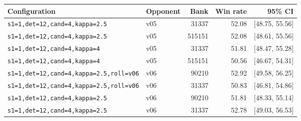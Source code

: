 \begin{tabular}{llrrr}
\toprule
Configuration & Opponent & Bank & Win rate & 95\% CI \\
\midrule
\texttt{s1=1,det=12,cand=4,kappa=2.5} & v05 & 31337 & 52.08 & [48.75, 55.56] \\
\texttt{s1=1,det=12,cand=4,kappa=2.5} & v05 & 515151 & 52.08 & [48.61, 55.56] \\
\texttt{s1=1,det=12,cand=4,kappa=4} & v05 & 31337 & 51.81 & [48.47, 55.28] \\
\texttt{s1=1,det=12,cand=4,kappa=4} & v05 & 515151 & 50.56 & [46.67, 54.31] \\
\texttt{s1=1,det=12,cand=4,kappa=2.5,roll=v06} & v06 & 90210 & 52.92 & [49.58, 56.25] \\
\texttt{s1=1,det=12,cand=4,kappa=2.5,roll=v06} & v06 & 31337 & 50.83 & [46.81, 54.86] \\
\texttt{s1=1,det=12,cand=4,kappa=2.5} & v06 & 90210 & 51.81 & [48.33, 55.14] \\
\texttt{s1=1,det=12,cand=4,kappa=2.5} & v06 & 31337 & 52.78 & [49.03, 56.53] \\
\bottomrule
\end{tabular}
